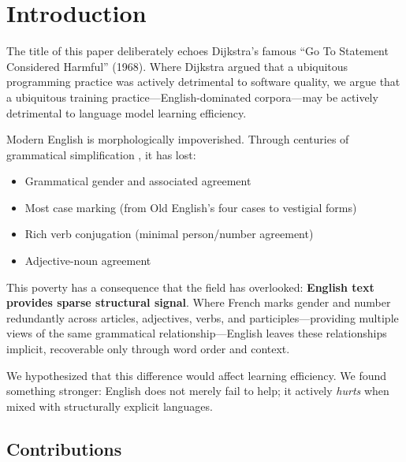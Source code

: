 \documentclass[11pt,a4paper]{article}
\begin{document}
\section{Introduction}

The title of this paper deliberately echoes Dijkstra's famous ``Go To Statement Considered Harmful'' (1968). Where Dijkstra argued that a ubiquitous programming practice was actively detrimental to software quality, we argue that a ubiquitous training practice---English-dominated corpora---may be actively detrimental to language model learning efficiency.

Modern English is morphologically impoverished. Through centuries of grammatical simplification \cite{mcwhorter2001power, dryer2013wals}, it has lost:
\begin{itemize}
    \item Grammatical gender and associated agreement
    \item Most case marking (from Old English's four cases to vestigial forms)
    \item Rich verb conjugation (minimal person/number agreement)
    \item Adjective-noun agreement
\end{itemize}

This poverty has a consequence that the field has overlooked: \textbf{English text provides sparse structural signal}. Where French marks gender and number redundantly across articles, adjectives, verbs, and participles---providing multiple views of the same grammatical relationship---English leaves these relationships implicit, recoverable only through word order and context.

We hypothesized that this difference would affect learning efficiency. We found something stronger: English does not merely fail to help; it actively \emph{hurts} when mixed with structurally explicit languages.

\subsection{Contributions}
\end{document}

